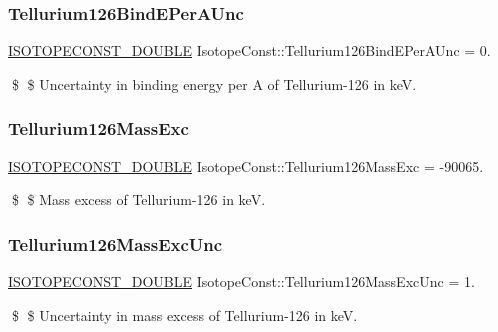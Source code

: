 \subsubsection{\texorpdfstring{Tellurium126\+Bind\+E\+Per\+A\+Unc}{Tellurium126BindEPerAUnc}}
{\footnotesize\ttfamily \mbox{\hyperlink{group___isotope_const-_macros_ga8f45a7272ce02c0b4c65c44636ed719a}{I\+S\+O\+T\+O\+P\+E\+C\+O\+N\+S\+T\+\_\+\+D\+O\+U\+B\+LE}} Isotope\+Const\+::\+Tellurium126\+Bind\+E\+Per\+A\+Unc = 0.}

\$ \$ Uncertainty in binding energy per A of Tellurium-\/126 in keV. \mbox{\label{group___isotope_const-_tellurium-_te126_ga92732a5d46a20e2b6881c68cf84e2899}} 
\subsubsection{\texorpdfstring{Tellurium126\+Mass\+Exc}{Tellurium126MassExc}}
{\footnotesize\ttfamily \mbox{\hyperlink{group___isotope_const-_macros_ga8f45a7272ce02c0b4c65c44636ed719a}{I\+S\+O\+T\+O\+P\+E\+C\+O\+N\+S\+T\+\_\+\+D\+O\+U\+B\+LE}} Isotope\+Const\+::\+Tellurium126\+Mass\+Exc = -\/90065.}

\$ \$ Mass excess of Tellurium-\/126 in keV. \mbox{\label{group___isotope_const-_tellurium-_te126_gaf25f16b80900356cd90086479f779b06}} 
\subsubsection{\texorpdfstring{Tellurium126\+Mass\+Exc\+Unc}{Tellurium126MassExcUnc}}
{\footnotesize\ttfamily \mbox{\hyperlink{group___isotope_const-_macros_ga8f45a7272ce02c0b4c65c44636ed719a}{I\+S\+O\+T\+O\+P\+E\+C\+O\+N\+S\+T\+\_\+\+D\+O\+U\+B\+LE}} Isotope\+Const\+::\+Tellurium126\+Mass\+Exc\+Unc = 1.}

\$ \$ Uncertainty in mass excess of Tellurium-\/126 in keV. \mbox{\label{group___isotope_const-_tellurium-_te126_ga0622fb5e9013878927250bd7e8a33ff6}} 
